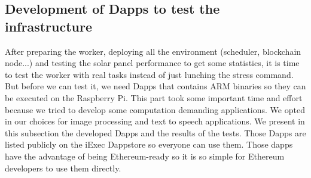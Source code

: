     \subsection{Development of Dapps to test the infrastructure}
    After preparing the worker, deploying all the environment (scheduler, blockchain node...) and testing
    the solar panel performance to get some statistics, it is time to test the worker with real tasks
    instead of just lunching the stress command. But before we can test it, we need Dapps that contains ARM
    binaries so they can be executed on the Raspberry Pi. This part took some important time and effort because
    we tried to develop some computation demanding applications. We opted in our choices for image processing
    and text to speech applications. We present in this subsection the developed Dapps and the results of the
    tests. Those Dapps are listed publicly on the iExec Dappstore so everyone can use them. Those dapps have
    the advantage of being Ethereum-ready so it is so simple for Ethereum developers to use them directly.

